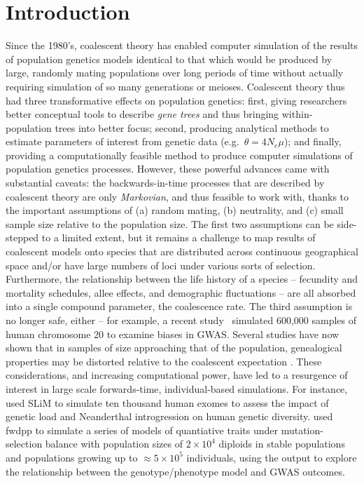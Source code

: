 \documentclass{article}
\begin{document}
\section*{Introduction}

Since the 1980's, coalescent theory has enabled computer simulation of the results of population genetics models
identical to that which would be produced by large, randomly mating populations over long periods of time
without actually requiring simulation of so many generations or meioses.
Coalescent theory thus had three transformative effects on population genetics:
first, giving researchers better conceptual tools to describe \emph{gene trees} and thus bringing within-population trees into better focus;
second, producing analytical methods to estimate parameters of interest from genetic data (e.g.\ $\theta = 4N_e \mu$);
and finally, providing a computationally feasible method to produce computer simulations of population genetics processes.
However, these powerful advances came with substantial caveats:
the backwards-in-time processes that are described by coalescent theory
are only \emph{Markovian}, and thus feasible to work with,
thanks to the important assumptions of
(a) random mating,
(b) neutrality,
and (c) small sample size relative to the population size.
The first two assumptions can be side-stepped to a limited extent,
but it remains a challenge to map results of coalescent models
onto species that are distributed across continuous geographical space
and/or have large numbers of loci under various sorts of selection.
Furthermore, the relationship between the life history of a species --
fecundity and mortality schedules, allee effects, and demographic fluctuations --
are all absorbed into a single compound parameter, the coalescence rate.
The third assumption is no longer safe, either --
for example, a recent study~\citep{martin2017human}
simulated 600,000 samples of human chromosome 20 to examine biases in GWAS.
Several studies have now shown that in samples of size approaching that of the population,
genealogical properties may be distorted relative to the coalescent expectation
\citep{wakeley2003gene,maruvka2011recovering,bhaskar2014distortion}.
These considerations, and increasing computational power, have led to a resurgence of
interest in large scale forwards-time, individual-based simulations.
For instance, \citet{harris2016genetic} used SLiM \citep{slim} to simulate ten thousand human exomes
to assess the impact of genetic load and Neanderthal introgression on human genetic diversity.
\cite{Sanjak2017-ko} used
fwdpp \citep{fwdpp} to simulate a series of models of quantiative traits under mutation-selection balance with
population sizes of $2 \times 10^4$ diploids in stable populations and populations growing up to $\approx 5
\times 10^5$ individuals, using the output to explore the relationship between the genotype/phenotype model and GWAS
outcomes.
\end{document}
